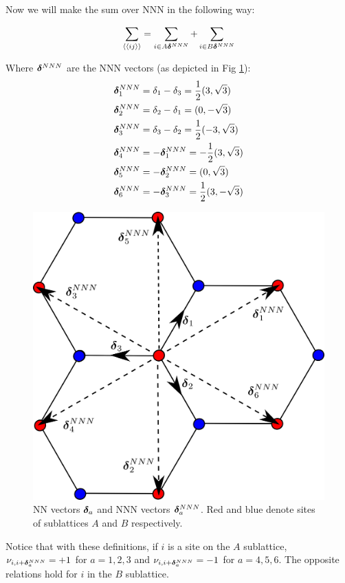 Now we will make the sum over NNN in the following way:

\begin{equation}
\sum_{\langle \langle i j \rangle \rangle} = \sum_{i\in A \boldsymbol{\delta}^{NNN}} +  \sum_{i\in B \boldsymbol{\delta}^{NNN}}
\end{equation}

Where $\boldsymbol{\delta}^{NNN}$ are the NNN vectors (as depicted in Fig \ref{Fig.Magnon.Vecs}):
\begin{align*}
\boldsymbol{\delta}^{NNN}_1 &= \delta_1-\delta_3 = \frac{1}{2}(3, \sqrt{3}) \\
\boldsymbol{\delta}^{NNN}_2 &= \delta_2-\delta_1 = (0, -\sqrt{3}) \\
\boldsymbol{\delta}^{NNN}_3 &= \delta_3-\delta_2 = \frac{1}{2}(-3, \sqrt{3}) \\
\boldsymbol{\delta}^{NNN}_4 &= -\boldsymbol{\delta}^{NNN}_1 = -\frac{1}{2}(3, \sqrt{3}) \\
\boldsymbol{\delta}^{NNN}_5 &= -\boldsymbol{\delta}^{NNN}_2 = (0, \sqrt{3}) \\
\boldsymbol{\delta}^{NNN}_6 &= -\boldsymbol{\delta}^{NNN}_3 = \frac{1}{2}(3, -\sqrt{3}) \\
\end{align*}
\begin{figure}
\centering
  \includegraphics[width=0.7\linewidth]{../Figures/NNNvec.png}
  \caption{NN vectors $\boldsymbol{\delta}_a$ and NNN vectors $\boldsymbol{\delta}^{NNN}_a$. Red and blue denote sites of sublattices $A$ and $B$ respectively.}
\label{Fig.Magnon.Vecs}
\end{figure}
Notice that with these definitions, if $i$ is a site on the $A$ sublattice, $\nu_{i,i+\boldsymbol{\delta}^{NNN}_a}=+1$ for $a=1,2,3$ and $\nu_{i,i+\boldsymbol{\delta}^{NNN}_a}=-1$ for $a=4,5,6$. The opposite relations hold for $i$ in the $B$ sublattice.

